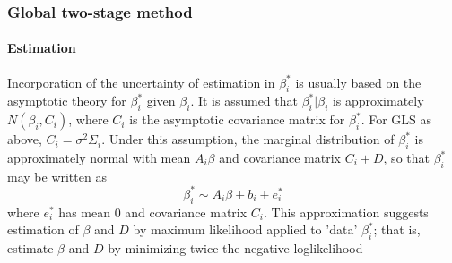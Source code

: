 \subsubsection{Global two-stage method}

\paragraph{Estimation}
Incorporation of the uncertainty of estimation in $\beta_i^*$ is usually based on the asymptotic theory for $\beta_i^*$ given $\beta_i$. It is assumed that $\beta_i^*|\beta_i$ is approximately $N(\beta_i,C_i)$, where $C_i$ is the asymptotic covariance matrix for $\beta_i^*$. For GLS as above, $C_i=\sigma^2\Sigma_i$. Under this assumption, the marginal distribution of $\beta_i^*$ is approximately normal with mean $A_i\beta$ and covariance matrix $C_i+D$, so that $\beta_i^*$ may be written as
\begin{equation}
  \beta_i^* \sim A_i\beta+b_i+e_i^*
\end{equation}
where $e_i^*$ has mean $0$ and covariance matrix $C_i$. This approximation suggests estimation of $\beta$ and $D$ by maximum likelihood applied to 'data' $\beta_i^*$; that is, estimate $\beta$ and $D$ by minimizing twice the negative loglikelihood
